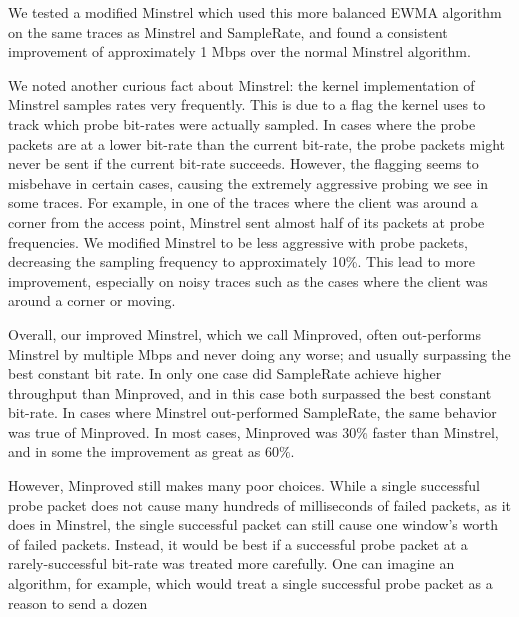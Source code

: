 \documentclass[letterpaper,twocolumn,10pt]{article}
\begin{document}
We tested a modified Minstrel which used this more balanced EWMA algorithm on the same traces as Minstrel and SampleRate, and found a consistent improvement of approximately 1 Mbps over the normal Minstrel algorithm.

We noted another curious fact about Minstrel: the kernel implementation of Minstrel samples rates very frequently.  This is due to a flag the kernel uses to track which probe bit-rates were actually sampled.  In cases where the probe packets are at a lower bit-rate than the current bit-rate, the probe packets might never be sent if the current bit-rate succeeds.  However, the flagging seems to misbehave in certain cases, causing the extremely aggressive probing we see in some traces.  For example, in one of the traces where the client was around a corner from the access point, Minstrel sent almost half of its packets at probe frequencies.  We modified Minstrel to be less aggressive with probe packets, decreasing the sampling frequency to approximately 10\%.  This lead to more improvement, especially on noisy traces such as the cases where the client was around a corner or moving.

Overall, our improved Minstrel, which we call Minproved, often out-performs Minstrel by multiple Mbps and never doing any worse; and usually surpassing the best constant bit rate.  In only one case did SampleRate achieve higher throughput than Minproved, and in this case both surpassed the best constant bit-rate.  In cases where Minstrel out-performed SampleRate, the same behavior was true of Minproved.  In most cases, Minproved was $30\%$ faster than Minstrel, and in some the improvement as great as $60\%$.

However, Minproved still makes many poor choices.  While a single successful probe packet does not cause many hundreds of milliseconds of failed packets, as it does in Minstrel, the single successful packet can still cause one window's worth of failed packets.  Instead, it would be best if a successful probe packet at a rarely-successful bit-rate was treated more carefully.  One can imagine an algorithm, for example, which would treat a single successful probe packet as a reason to send a dozen 
\end{document}
